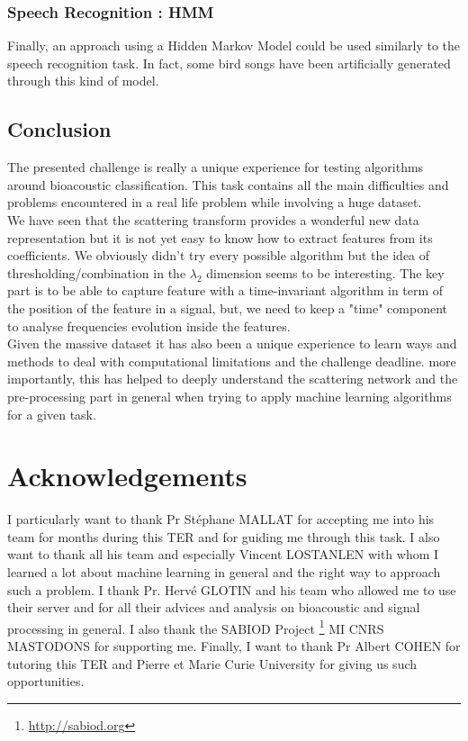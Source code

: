 \documentclass[a4paper]{report}
\begin{document}
\subsection{Speech Recognition : HMM}
Finally, an approach using a Hidden Markov Model could be used similarly to the speech recognition task. In fact, some bird songs have been artificially generated through this kind of model. 
\section{Conclusion}


The presented challenge is really a unique experience for testing algorithms around bioacoustic classification. This task contains all the main difficulties and problems encountered in a real life problem while involving a huge dataset. 
\\
We have seen that the scattering transform provides a wonderful new data representation but it is not yet easy to know how to extract features from its coefficients. We obviously didn't try every possible algorithm but the idea of thresholding/combination in the $\lambda_2$ dimension seems to be interesting. The key part is to be able to capture feature with a time-invariant algorithm in term of the position of the feature in a signal, but, we need to keep a "time" component to analyse frequencies evolution inside the features.
\\

Given the massive dataset it has also been a unique experience to learn ways and methods to deal with computational limitations and the challenge deadline.
more importantly, this has helped to deeply understand the scattering network and the pre-processing part in general when trying to apply machine learning algorithms for a given task.


\chapter*{Acknowledgements}
I particularly want to thank Pr St\'ephane MALLAT for accepting me into his team for months during this TER and for guiding me through this task. I also want to thank all his team and especially Vincent LOSTANLEN with whom I learned a lot about machine learning in general and the right way to approach such a problem. 
I thank Pr. Herv\'e GLOTIN and his team who  allowed me to use their server and for all their advices and analysis on bioacoustic and signal processing in general.
I also thank the SABIOD Project \footnote{\url{http://sabiod.org}}
MI CNRS MASTODONS for supporting me.
Finally, I want to thank Pr Albert COHEN for tutoring this TER and Pierre et Marie Curie University for giving us such opportunities.
\end{document}
